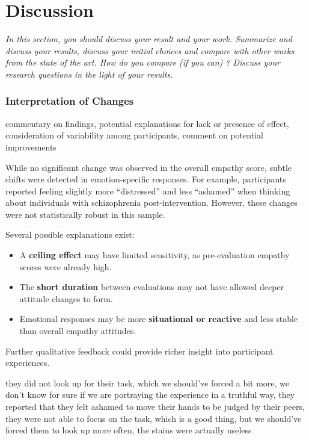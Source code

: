 \chapter{Discussion}
\label{ch:discussion}

\emph{In this section, you should discuss your result and your work. Summarize and discuss your results,  discuss your initial choices and compare with other works from the state of the art. How do you compare (if you can) ? Discuss your research questions in the light of your results. }



\subsection{Interpretation of Changes}

commentary on findings, potential explanations for lack or presence of effect, consideration of variability among participants, comment on potential improvements


While no significant change was observed in the overall empathy score, subtle shifts were detected in emotion-specific responses. For example, participants reported feeling slightly more “distressed” and less “ashamed” when thinking about individuals with schizophrenia post-intervention. However, these changes were not statistically robust in this sample.

Several possible explanations exist:
\begin{itemize}
  \item A \textbf{ceiling effect} may have limited sensitivity, as pre-evaluation empathy scores were already high.
  \item The \textbf{short duration} between evaluations may not have allowed deeper attitude changes to form.
  \item Emotional responses may be more \textbf{situational or reactive} and less stable than overall empathy attitudes.
\end{itemize}

Further qualitative feedback could provide richer insight into participant experiences.


they did not look up for their task, which we should've forced a bit more,
we don't know for sure if we are portraying the experience in a truthful way,
they reported that they felt ashamed to move their hands to be judged by their peers,
they were not able to focus on the task, which is a good thing, but we should've forced them to look up more often,
the stains were actually useless